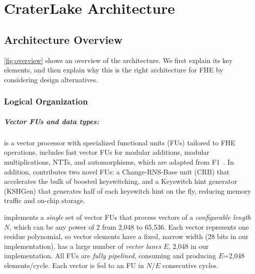 \chapter{CraterLake Architecture}

\section{Architecture Overview}\label{sec:overview}

\autoref{fig:overview} shows an overview of the \name architecture.
We first explain its key elements, and then explain why this is the right
architecture for FHE by considering design alternatives.


\subsection{Logical Organization}

\paragraph{Vector FUs and data types:}
\name is a vector processor with specialized functional units (FUs) tailored to FHE operations.
\name includes fast vector FUs for modular additions, modular multiplications, NTTs, and automorphisms,
which are adapted from F1~\cite{feldmann:micro21:f1}.
In addition, \name contributes two novel FUs:
a Change-RNS-Base unit (CRB) that accelerates the bulk of boosted keyswitching,
and a Keyswitch hint generator (KSHGen) that generates half of each keyswitch
hint on the fly, reducing memory traffic and on-chip storage.

\figOverview

\name implements a \emph{single} set of vector FUs
that process vectors of a \emph{configurable length} $N$,
which can be any power of 2 from 2,048 to 65,536.
Each vector represents one residue polynomial, so vector elements
have a fixed, narrow width (28 bits in our implementation).
\name has a large number of \emph{vector lanes} $E$, 2,048 in our implementation.
All FUs are \emph{fully pipelined}, consuming and producing $E$=2,048 elements/cycle.
Each vector is fed to an FU in $N/E$ consecutive cycles.

